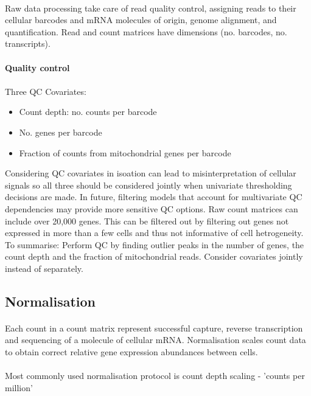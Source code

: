 \documentclass[a4paper,12pt]{article}
\begin{document}
\paragraph{}
Raw data processing take care of read quality control, assigning reads to their cellular barcodes and mRNA molecules of origin, genome alignment, and quantification. 
Read and count matrices have dimensions (no. barcodes, no. transcripts).


\paragraph{Quality control}
\paragraph{}
Three QC Covariates:
\begin{itemize}
\item Count depth: no. counts per barcode
\item No. genes per barcode
\item Fraction of counts from mitochondrial genes per barcode
\end{itemize}

Considering QC covariates in isoation can lead to misinterpretation of cellular signals so all three should be considered jointly when univariate thresholding decisions are made. In future, filtering models that account for multivariate QC dependencies may provide more sensitive QC options.
Raw count matrices can include over 20,000 genes. This can be filtered out by filtering out genes not expressed in more than a few cells and thus not informative of cell hetrogeneity.
To summarise: Perform QC by finding outlier peaks in the number of genes, the count depth and the fraction of mitochondrial reads. Consider covariates jointly instead of separately.

\subsection{Normalisation}
\paragraph{}
Each count in a count matrix represent successful capture, reverse transcription and sequencing of a molecule of cellular mRNA.
Normalisation scales count data to obtain correct relative gene expression abundances between cells.
\paragraph{}
Most commonly used normalisation protocol is count depth scaling - 'counts per million'
\end{document}
